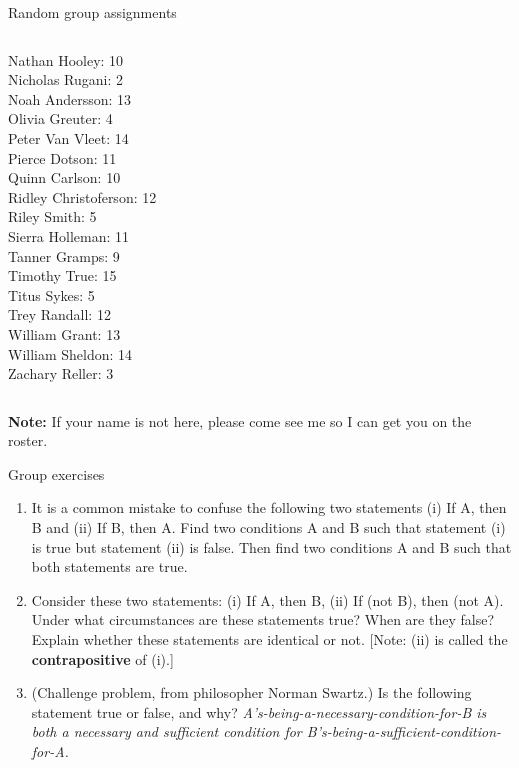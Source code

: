 \documentclass[10pt]{beamer}
\begin{document}
\begin{frame}{Random group assignments}
\begin{columns}
\begin{column}{0.33\textwidth}
Nathan Hooley: 10 \\ 
Nicholas Rugani: 2 \\ 
Noah Andersson: 13 \\ 
Olivia Greuter: 4 \\ 
Peter Van Vleet: 14 \\ 
Pierce Dotson: 11 \\ 
Quinn Carlson: 10 \\ 
Ridley Christoferson: 12 \\ 
Riley Smith: 5 \\ 
Sierra Holleman: 11 \\ 
Tanner Gramps: 9 \\ 
Timothy True: 15 \\ 
Titus Sykes: 5 \\ 
Trey Randall: 12 \\ 
William Grant: 13 \\ 
William Sheldon: 14 \\ 
Zachary Reller: 3 \\\end{column}
\end{columns}
\vfill \vfill \vfill
\textbf{Note:} If your name is not here, please come see me so I can get you on the roster. 
\end{frame}



\begin{frame}{Group exercises}
\small 
\begin{enumerate}
	\item It is a common mistake to confuse the following two statements (i) If A, then B and (ii) If B, then A. Find two conditions A and B such that statement (i) is true but statement (ii) is false. Then find two conditions A and B such that both statements are true. 
	\item Consider these two statements: (i) If A, then B, (ii) If (not B), then (not A).  Under what circumstances are these statements true?  When are they false? Explain whether these statements are identical or not. \alert{[Note: (ii) is called the \textbf{contrapositive} of (i).]}
	\item (Challenge problem, from philosopher Norman Swartz.)  Is the following statement true or false, and why? \textit{A's-being-a-necessary-condition-for-B is both a necessary and sufficient condition for B's-being-a-sufficient-condition-for-A.}
\end{enumerate}
	
\end{frame}
\end{document}
